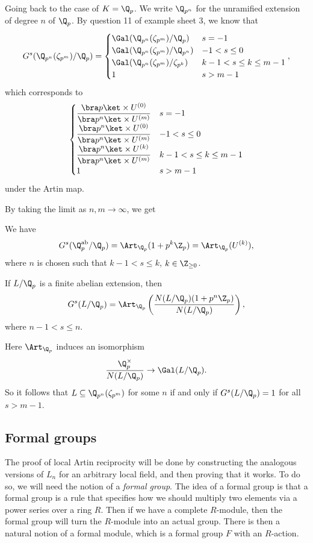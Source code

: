 \documentclass[a4paper]{article}
\begin{document}
\begin{eg}
  Going back to the case of $K = \Q_p$. We write $\Q_{p^n}$ for the unramified extension of degree $n$ of $\Q_p$. By question 11 of example sheet 3, we know that
  \[
    G^s(\Q_{p^n}(\zeta_{p^m})/\Q_p) =
    \begin{cases}
      \Gal(\Q_{p^n}(\zeta_{p^m}) / \Q_p) & s = -1\\
      \Gal(\Q_{p^n}(\zeta_{p^m}) / \Q_{p^n}) & -1 < s \leq 0\\
      \Gal(\Q_{p^n}(\zeta_{p^m}) / \zeta_{p^k}) & k - 1 < s \leq k \leq m - 1\\
      1 & s > m -1
    \end{cases},
  \]
  which corresponds to
  \[
    \begin{cases}
      \displaystyle \frac{\bra p\ket \times U^{(0)}}{\bra p^n \ket \times U^{(m)}} & s = -1\\
      \displaystyle \frac{\bra p^n\ket \times U^{(0)}}{\bra p^n \ket \times U^{(m)}} & -1 < s \leq 0\\
      \displaystyle \frac{\bra p^n\ket \times U^{(k)}}{\bra p^n \ket \times U^{(m)}} & k - 1 < s \leq k \leq m - 1\\
      1 & s > m - 1
    \end{cases}
  \]
  under the Artin map.
\end{eg}

By taking the limit as $n, m \to \infty$, we get
\begin{thm}
  We have
  \[
    G^s(\Q_p^{\mathrm{ab}}/\Q_p) = \Art_{\Q_p}(1 + p^k \Z_p) = \Art_{\Q_p} (U^{(k)}),
  \]
  where $n$ is chosen such that $k - 1< s \leq k$, $k \in \Z_{\geq 0}$.
\end{thm}

\begin{cor}
  If $L/\Q_p$ is a finite abelian extension, then
  \[
    G^s(L/\Q_p) = \Art_{\Q_p}\left(\frac{N(L/\Q_p)(1 + p^n \Z_p)}{N(L/\Q_p)}\right),
  \]
  where $n - 1 < s \leq n$.
\end{cor}
Here $\Art_{\Q_p}$ induces an isomorphism
\[
  \frac{\Q_p^\times}{N(L/\Q_p)} \to \Gal(L/\Q_p).
\]
So it follows that $L \subseteq \Q_{p^n}(\zeta_{p^m})$ for some $n$ if and only if $G^s(L/\Q_p) = 1$ for all $s > m - 1$. %

\subsection{Formal groups}
The proof of local Artin reciprocity will be done by constructing the analogous versions of $L_n$ for an arbitrary local field, and then proving that it works. To do so, we will need the notion of a \emph{formal group}. The idea of a formal group is that a formal group is a rule that specifies how we should multiply two elements via a power series over a ring $R$. Then if we have a complete $R$-module, then the formal group will turn the $R$-module into an actual group. There is then a natural notion of a formal module, which is a formal group $F$ with an $R$-action.
\end{document}
